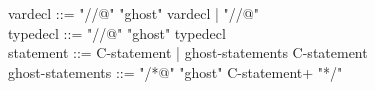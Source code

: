 \begin{syntax}
  
  
  vardecl ::= "//@" "ghost" vardecl 
          | "//@"  \\
   
  typedecl ::= "//@" "ghost" typedecl \\

  statement ::= C-statement | ghost-statements C-statement \\
  ghost-statements ::= "/*@" "ghost" C-statement+ "*/"

\end{syntax}

